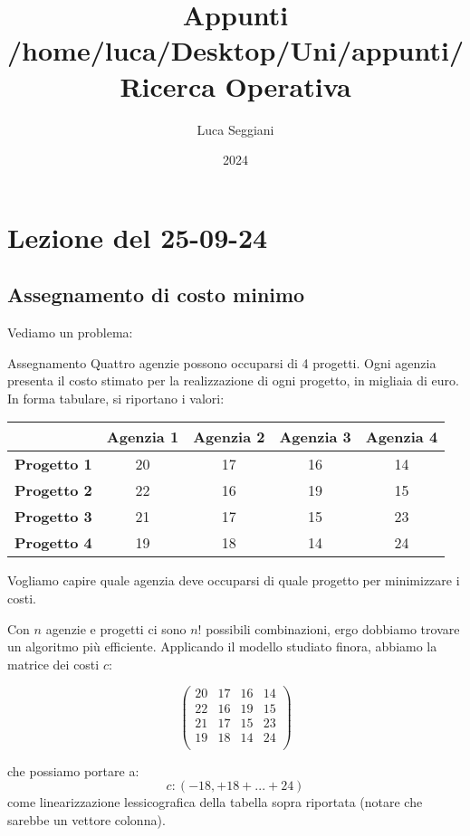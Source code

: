 \documentclass[a4paper,11pt]{article}
\title{Appunti /home/luca/Desktop/Uni/appunti/Ricerca Operativa}
\author{Luca Seggiani}
\date{2024}
\begin{document}
\section{Lezione del 25-09-24}

\thispagestyle{empty}
\pagestyle{fancy}

\subsection{Assegnamento di costo minimo}
Vediamo un problema:
\begin{problem}{Assegnamento}
	Quattro agenzie possono occuparsi di 4 progetti.
	Ogni agenzia presenta il costo stimato per la realizzazione di ogni progetto, in migliaia di euro.
	In forma tabulare, si riportano i valori:

	\center {}
	\begin{tabular} { | c | c | c | c | c | }
		\hline
		& \bfseries Agenzia 1 & \bfseries Agenzia 2 & \bfseries Agenzia 3 & \bfseries Agenzia 4 \\
		\hline 
		\bfseries Progetto 1 & 20 & 17 & 16 & 14 \\
		\bfseries Progetto 2 & 22 & 16 & 19 & 15 \\
		\bfseries Progetto 3 & 21 & 17 & 15 & 23 \\ 
		\bfseries Progetto 4 & 19 & 18 & 14 & 24 \\
		\hline
	\end{tabular}

	\par\bigskip
	
	Vogliamo capire quale agenzia deve occuparsi di quale progetto per minimizzare i costi.

\end{problem}

Con $n$ agenzie e progetti ci sono $n!$ possibili combinazioni, ergo dobbiamo trovare un algoritmo più efficiente. 
Applicando il modello studiato finora, abbiamo la matrice dei costi $c$:

$$
\begin{pmatrix}
 20 & 17 & 16 & 14 \\
 22 & 16 & 19 & 15 \\
 21 & 17 & 15 & 23 \\
 19 & 18 & 14 & 24 \\
\end{pmatrix}
$$

che possiamo portare a:
$$ c: ( -18, +18 + ... + 24 ) $$
come linearizzazione lessicografica della tabella sopra riportata (notare che sarebbe un vettore colonna).
\end{document}
